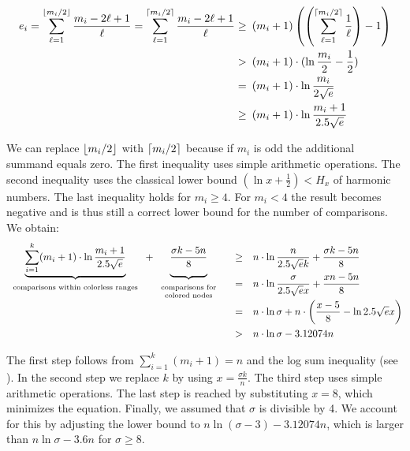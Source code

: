 \begin{alignat*}{1}\label{eqn:MLlower}
e_i = \sum_{\ell = 1}^{\floor{m_i / 2}} \frac{m_i - 2\ell + 1} \ell = \sum_{\ell = 1}^{\ceil{m_i / 2}} \frac{m_i - 2\ell + 1} \ell \geq\enskip &%
(m_i + 1) \left(\left(\sum_{\ell = 1}^{\ceil{m_i / 2}} \frac 1 \ell \right) - 1\right)\\
>\enskip &%
(m_i + 1) \cdot(\ln \frac {m_i} 2 - \frac 1 2)\\
=\enskip &%
(m_i + 1) \cdot\ln \frac {m_i}{2\sqrt{e}}\\
\geq\enskip &%
(m_i + 1) \cdot\ln \frac {m_i + 1}{2.5\sqrt{e}}%
\end{alignat*}

We can replace $\left\lfloor m_i / 2\right\rfloor$ with $\left\lceil m_i / 2\right\rceil$ because if $m_i$ is odd the additional summand equals zero.
The first inequality uses simple arithmetic operations. 
The second inequality uses the classical lower bound $(\ln x + \frac 1 2) < H_x$ of harmonic numbers. 
The last inequality holds for $m_i \geq 4$. 
For $m_i < 4$ the result becomes negative and is thus still a correct lower bound for the number of comparisons.
We obtain:

\def\numsubstr{k}%
\begin{alignat*}{1} 
\smash{%
\underbrace{\sum_{i=1}^\numsubstr (m_i + 1) \cdot \ln\frac {m_i + 1}{2.5\sqrt{e}}}%
_{\text{\begin{tabular}{c}comparisons within colorless ranges\end{tabular}}} + %
\underbrace{\vphantom{\sum_{i=1}^\numsubstr}\frac{\sigma k - 5n} 8}%
_{\text{\begin{tabular}{c}\vphantom{lbthi}%
comparisons for\\[-.5em]%
colored nodes\end{tabular}}}%
}\quad \geq\quad & n \cdot \ln \frac{n}{2.5\sqrt{e}\numsubstr} + \frac{\sigma k - 5n} 8\\
=\quad &n \cdot \ln \frac \sigma {2.5\sqrt{e}x} + \frac{xn - 5n} 8\\
=\quad &n \cdot \ln \sigma + n \cdot \left(\frac{x - 5} 8 - \ln 2.5\sqrt{e}x\right)\\
>\quad &n \cdot \ln \sigma - 3.12074n
\end{alignat*}%

The first step follows from $\sum_{i=1}^\numsubstr (m_i + 1) = n$ and the log sum inequality (see \cite[Theorem 2.7.1]{Cover2006}). In the second step we replace $\numsubstr$ by using $x = \frac{\sigma \numsubstr} n$. The third step uses simple arithmetic operations. The last step is reached by substituting $x = 8$, which minimizes the equation.
Finally, we assumed that $\sigma$ is divisible by 4. We account for this by adjusting the lower bound to $n \ln (\sigma - 3) - 3.12074n$, which is larger than $n \ln \sigma - 3.6n$ for $\sigma \geq 8$.


\lowerbound*



